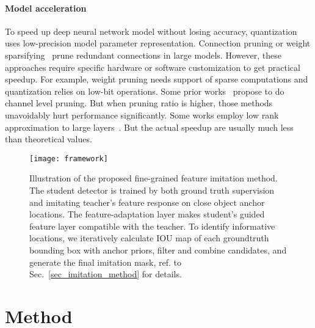 \documentclass[10pt,twocolumn,letterpaper]{article}
\begin{document}
\vspace{-4mm}
\paragraph{Model acceleration} To speed up  deep neural network model without losing accuracy,  quantization~\cite{zhou2017incremental, rastegari2016xnor, wu2016quantized, Gysel2016HardwareorientedAO, Han2015LearningBW, Wu2016QuantizedCN}  uses low-precision model parameter representation. Connection pruning or weight sparsifying~\cite{Han2015LearningBW, Han2015DeepCC, park2016faster} prune redundant connections in large models. However, these approaches require specific hardware  or software customization to get practical speedup. For example, weight pruning needs support of sparse computations and quantization relies on low-bit operations. Some prior works~\cite{li2016pruning,luo2017thinet, anisimov2017towards} propose to do channel level pruning. But when pruning ratio is higher, those methods unavoidably hurt performance significantly. Some works employ low rank approximation to large layers~\cite{tai2015convolutional, wen2017coordinating}. But the actual speedup are usually much less than theoretical values.


\begin{figure}[!t]
	\centering
\texttt{[image: framework]}
	\caption{Illustration of the proposed fine-grained feature imitation method. The student detector is trained by both ground truth supervision and imitating  teacher's feature response on close object anchor locations. The feature-adaptation layer makes  student's guided feature layer compatible with the teacher. To identify informative locations, we iteratively calculate IOU map of each groundtruth bounding box with anchor priors, filter and combine candidates, and generate the final imitation mask, ref. to Sec.~\ref{sec_imitation_method} for details. 
}
	\label{framework}
	\vspace{-4mm}
\end{figure}

\section{Method}
\end{document}
